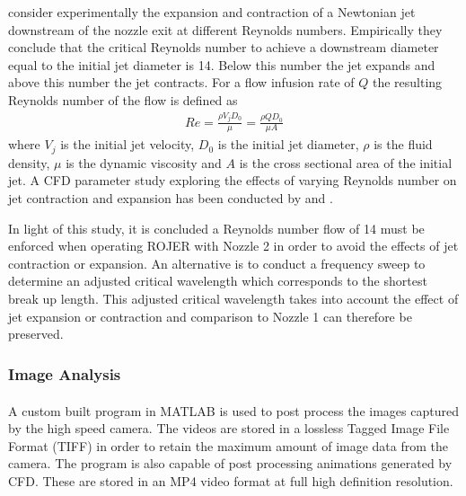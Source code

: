 \documentclass[11pt]{article}
\begin{document}
\cite{goren1966shape} consider experimentally the expansion and contraction of 
a Newtonian jet downstream of the nozzle exit at different Reynolds numbers. 
Empirically they conclude that the critical Reynolds number to achieve a 
downstream diameter equal to the initial jet diameter is 14. Below this number 
the jet expands and above this number the jet contracts. For a flow infusion 
rate of $Q$ the resulting Reynolds number of the flow is defined as
\begin{align*}
Re = \frac{\rho V_j D_0 }{\mu} = \frac{\rho Q D_0 }{\mu A }
\end{align*}
where $V_j$ is the initial jet velocity, $D_0$ is the initial jet diameter, 
$\rho$ is the fluid density, $\mu$ is the dynamic viscosity and $A$ is the 
cross sectional area of the initial jet. A CFD parameter study exploring the 
effects of varying Reynolds number on jet contraction and expansion has been 
conducted by \cite{greiciunas2015report} and \cite{gorbatenko2015report}.

In light of this study, it is concluded a Reynolds number flow of 14 must be 
enforced when operating ROJER with Nozzle 2 in order to avoid the effects of 
jet contraction or expansion. An alternative is to conduct a frequency sweep to 
determine an adjusted critical wavelength which corresponds to the shortest 
break up length. This adjusted critical wavelength takes into account the 
effect of jet expansion or contraction and comparison to Nozzle 1 can therefore 
be preserved.

\subsubsection{Image Analysis} \label{sec:image_analysis}
A custom built program in MATLAB \textsuperscript{\textregistered} is used to 
post process the images captured by the high speed camera. The videos are 
stored in a lossless Tagged Image File Format (TIFF) in order to retain the 
maximum amount of image data from the camera. The program is also capable of 
post processing animations generated by CFD. These are stored in an MP4 video 
format at full high definition resolution.
\end{document}
